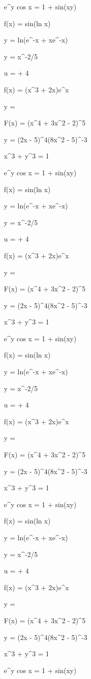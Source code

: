 \documentclass[11pt,a4paper]{article}
\begin{document}
 e^y cos x = 1 + sin(xy)

 f(x) = sin(ln x)

 y = ln(e^{-x} + xe^{-x})

y = x^{-2/5}

u =  + 4

f(x) = (x^3 + 2x)e^x

y = 

 F(x) = (x^4 + 3x^2 - 2)^5

 y = (2x - 5)^4(8x^2 - 5)^{-3}

 x^3 + y^3 = 1

 e^y cos x = 1 + sin(xy)

 f(x) = sin(ln x)

 y = ln(e^{-x} + xe^{-x})

y = x^{-2/5}

u =  + 4

f(x) = (x^3 + 2x)e^x

y = 

 F(x) = (x^4 + 3x^2 - 2)^5

 y = (2x - 5)^4(8x^2 - 5)^{-3}

 x^3 + y^3 = 1

 e^y cos x = 1 + sin(xy)

 f(x) = sin(ln x)

 y = ln(e^{-x} + xe^{-x})

y = x^{-2/5}

u =  + 4

f(x) = (x^3 + 2x)e^x

y = 

 F(x) = (x^4 + 3x^2 - 2)^5

 y = (2x - 5)^4(8x^2 - 5)^{-3}

 x^3 + y^3 = 1

 e^y cos x = 1 + sin(xy)

 f(x) = sin(ln x)

 y = ln(e^{-x} + xe^{-x})

y = x^{-2/5}

u =  + 4

f(x) = (x^3 + 2x)e^x

y = 

 F(x) = (x^4 + 3x^2 - 2)^5

 y = (2x - 5)^4(8x^2 - 5)^{-3}

 x^3 + y^3 = 1

 e^y cos x = 1 + sin(xy)
\end{document}

